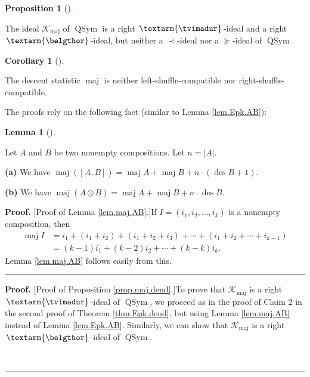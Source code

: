 \documentclass[numbers=enddot,12pt,final,onecolumn,notitlepage]{scrartcl}%
\theoremstyle{definition}
\newtheorem{lem}[theo]{Lemma}
\newenvironment{lemma}[1][]
{\begin{lem}[#1]\begin{leftbar}}
{\end{leftbar}\end{lem}}
\newtheorem{prop}[theo]{Proposition}
\newenvironment{proposition}[1][]
{\begin{prop}[#1]\begin{leftbar}}
{\end{leftbar}\end{prop}}
\newtheorem{coro}[theo]{Corollary}
\newenvironment{corollary}[1][]
{\begin{coro}[#1]\begin{leftbar}}
{\end{leftbar}\end{coro}}
\newenvironment{proof}[1][Proof]{\noindent\textbf{#1.} }{\ \rule{0.5em}{0.5em}}
\newenvironment{verlong}{}{}
\newcommand{\tvi}{\left. \textarm{\tvimadur} \right.}
\newcommand{\bel}{\left. \textarm{\belgthor} \right.}
\begin{document}
\begin{verlong}
\begin{proposition}
\label{prop.maj.dend}The ideal $\mathcal{K}_{\operatorname*{maj}}$ of
$\operatorname*{QSym}$ is a right $\tvi$-ideal and a right $\bel$-ideal, but
neither a $\left.  \prec\right.  $-ideal nor a $\left.  \succeq\right.
$-ideal of $\operatorname*{QSym}$.
\end{proposition}

\begin{corollary}
\label{cor.dendri.maj}The descent statistic $\operatorname*{maj}$ is neither
left-shuffle-compatible nor right-shuffle-compatible.
\end{corollary}

The proofs rely on the following fact (similar to Lemma \ref{lem.Epk.AB}):

\begin{lemma}
\label{lem.maj.AB}Let $A$ and $B$ be two nonempty compositions. Let
$n=\left\vert A\right\vert $.

\textbf{(a)} We have $\operatorname*{maj}\left(  \left[  A,B\right]  \right)
=\operatorname*{maj}A+\operatorname*{maj}B+n\cdot\left(  \operatorname{des}%
B+1\right)  $.

\textbf{(b)} We have $\operatorname*{maj}\left(  A\odot B\right)
=\operatorname*{maj}A+\operatorname*{maj}B+n\cdot\operatorname{des}B$.
\end{lemma}

\begin{proof}
[Proof of Lemma \ref{lem.maj.AB}.]If $I=\left(  i_{1},i_{2},\ldots
,i_{k}\right)  $ is a nonempty composition, then
\begin{align*}
\operatorname*{maj}I  &  =i_{1}+\left(  i_{1}+i_{2}\right)  +\left(
i_{1}+i_{2}+i_{3}\right)  +\cdots+\left(  i_{1}+i_{2}+\cdots+i_{k-1}\right) \\
&  =\left(  k-1\right)  i_{1}+\left(  k-2\right)  i_{2}+\cdots+\left(
k-k\right)  i_{k}.
\end{align*}
Lemma \ref{lem.maj.AB} follows easily from this.
\end{proof}

\begin{proof}
[Proof of Proposition \ref{prop.maj.dend}.]To prove that $\mathcal{K}%
_{\operatorname*{maj}}$ is a right $\tvi$-ideal of $\operatorname*{QSym}$, we
proceed as in the proof of Claim 2 in the second proof of Theorem
\ref{thm.Epk.dend}, but using Lemma \ref{lem.maj.AB} instead of Lemma
\ref{lem.Epk.AB}. Similarly, we can show that $\mathcal{K}%
_{\operatorname*{maj}}$ is a right $\bel$-ideal of $\operatorname*{QSym}$.


\end{proof}
\end{verlong}
\end{document}
